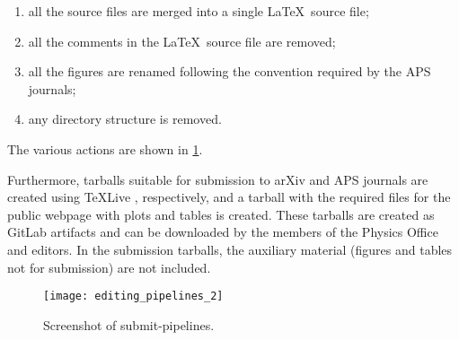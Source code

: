 \begin{enumerate}
\item all the source files are merged into a single \LaTeX\ source file;
\item all the comments in the \LaTeX\ source file are removed;
\item all the figures are renamed following the convention required by the APS journals;
\item any directory structure is removed.
\end{enumerate}
The various actions are shown in \cref{fig:submit-pipelines}.

Furthermore, tarballs suitable for submission to arXiv and APS journals are created using \TeX{}Live , respectively, and a tarball with the required files for the public webpage with plots and tables is created. These tarballs are created as GitLab artifacts and can be downloaded by the members of the Physics Office and editors. In the submission tarballs, the auxiliary material (figures and tables not for submission) are not included.

\begin{figure}[htb]
  \centering
  \texttt{[image: editing\_pipelines\_2]}
  \caption{Screenshot of submit-pipelines. }%
  \label{fig:submit-pipelines}
\end{figure}


